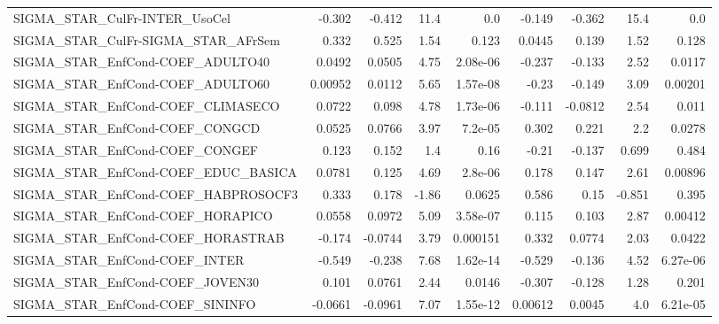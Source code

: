 \begin{tabular}{lrrrrrrrr}
SIGMA\_STAR\_CulFr-INTER\_UsoCel         &      -0.302 &       -0.412 &     11.4 &      0.0 &     -0.149 &      -0.362 &         15.4 &           0.0 \\
SIGMA\_STAR\_CulFr-SIGMA\_STAR\_AFrSem    &       0.332 &        0.525 &     1.54 &    0.123 &     0.0445 &       0.139 &         1.52 &         0.128 \\
SIGMA\_STAR\_EnfCond-COEF\_ADULTO40      &      0.0492 &       0.0505 &     4.75 & 2.08e-06 &     -0.237 &      -0.133 &         2.52 &        0.0117 \\
SIGMA\_STAR\_EnfCond-COEF\_ADULTO60      &     0.00952 &       0.0112 &     5.65 & 1.57e-08 &      -0.23 &      -0.149 &         3.09 &       0.00201 \\
SIGMA\_STAR\_EnfCond-COEF\_CLIMASECO     &      0.0722 &        0.098 &     4.78 & 1.73e-06 &     -0.111 &     -0.0812 &         2.54 &         0.011 \\
SIGMA\_STAR\_EnfCond-COEF\_CONGCD        &      0.0525 &       0.0766 &     3.97 &  7.2e-05 &      0.302 &       0.221 &          2.2 &        0.0278 \\
SIGMA\_STAR\_EnfCond-COEF\_CONGEF        &       0.123 &        0.152 &      1.4 &     0.16 &      -0.21 &      -0.137 &        0.699 &         0.484 \\
SIGMA\_STAR\_EnfCond-COEF\_EDUC\_BASICA   &      0.0781 &        0.125 &     4.69 &  2.8e-06 &      0.178 &       0.147 &         2.61 &       0.00896 \\
SIGMA\_STAR\_EnfCond-COEF\_HABPROSOCF3   &       0.333 &        0.178 &    -1.86 &   0.0625 &      0.586 &        0.15 &       -0.851 &         0.395 \\
SIGMA\_STAR\_EnfCond-COEF\_HORAPICO      &      0.0558 &       0.0972 &     5.09 & 3.58e-07 &      0.115 &       0.103 &         2.87 &       0.00412 \\
SIGMA\_STAR\_EnfCond-COEF\_HORASTRAB     &      -0.174 &      -0.0744 &     3.79 & 0.000151 &      0.332 &      0.0774 &         2.03 &        0.0422 \\
SIGMA\_STAR\_EnfCond-COEF\_INTER         &      -0.549 &       -0.238 &     7.68 & 1.62e-14 &     -0.529 &      -0.136 &         4.52 &      6.27e-06 \\
SIGMA\_STAR\_EnfCond-COEF\_JOVEN30       &       0.101 &       0.0761 &     2.44 &   0.0146 &     -0.307 &      -0.128 &         1.28 &         0.201 \\
SIGMA\_STAR\_EnfCond-COEF\_SININFO       &     -0.0661 &      -0.0961 &     7.07 & 1.55e-12 &    0.00612 &      0.0045 &          4.0 &      6.21e-05 \\

\end{tabular}
